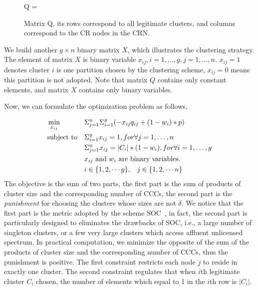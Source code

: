 \documentclass[journal,comsoc]{IEEEtran}
\theoremstyle{mytheoremstyle}
\theoremstyle{mytheoremstyle}
\theoremstyle{mytheoremstyle}
\newcommand{\ie}{i.e., }
\begin{document}
\begin{figure}[ht!]
\centering
Q = 	
\caption{Matrix Q, its rows correspond to all legitimate clusters, and columns correspond to the CR nodes in the CRN.}
\label{xx}
\end{figure}

We build another $g\times n$ binary matrix $X$, which illustrates the clustering strategy.
The element of matrix $X$ is binary variable $x_{ij}, i=1, \ldots, g, j=1, \ldots, n$.
$x_{ij}=1$ denotes cluster $i$ is one partition chosen by the clustering scheme, $x_{ij}=0$ means this partition is not adopted.
Note that matrix $Q$ contains only constant elements, and matrix $X$ contains only binary variables.

Now, we can formulate the optimization problem as follows,

\begin{equation}
\begin{aligned}
     &\min\limits_{x_{ij}} && \Sigma_{j=1}^n\Sigma_{i=1}^g (-x_{ij}q_{ij} + (1-w_i)*p) \\
     &\text{subject to}   && \Sigma_{i=1}^g x_{ij} = 1, for \forall j=1, \ldots, n \\
   &&& \Sigma_{j=1}^n x_{ij} = |C_i|*(1-w_i), for \forall i=1, \ldots, g \\
   &&& \text{$x_{ij}$ and $w_i$ are binary variables.}\\
   &&& i\in \{1,2, \cdots g\}, \hspace{0.3cm} j\in \{1,2,\cdots n\}
\notag
\end{aligned}
\end{equation}
The objective is the sum of two parts, the first part is the sum of products of cluster size and the corresponding number of CCCs, the second part is the \textit{punishment} for choosing the clusters whose sizes are not $\delta$.
We notice that the first part is the metric adopted by the scheme SOC~\cite{Lazos09}, in fact, the second part is particularly designed to eliminates the drawbacks of SOC, \ie a large number of singleton clusters, or a few very large clusters which access affluent unlicensed spectrum.
In practical computation, we minimize the opposite of the sum of the products of cluster size and the corresponding number of CCCs, thus the punishment is positive.
The first constraint restricts each node $j$ to reside in exactly one cluster.
The second constraint regulates that when $i$th legitimate cluster $C_i$ chosen, the number of elements which equal to 1 in the $i$th row is $|C_i|$.
\end{document}
